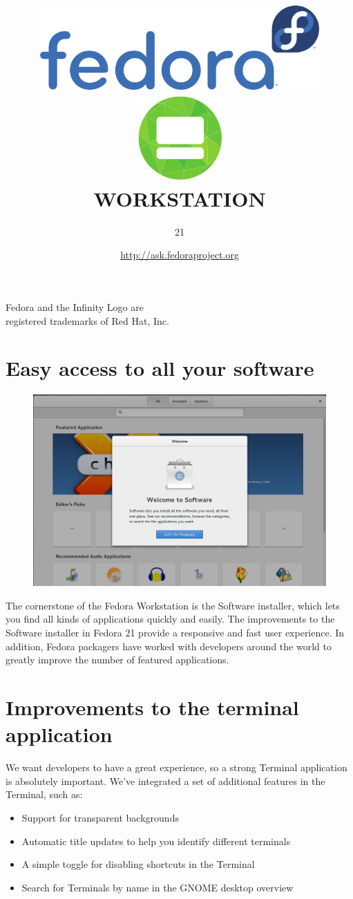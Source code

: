 \documentclass[
10pt
]{leaflet}
\title{\includegraphics[keepaspectratio,width=0.8\textwidth]{Logo_fedoralogo.png}\vspace{1cm}\\\includegraphics[keepaspectratio,scale=0.5]{workstation_logo_only.png}\\\vspace{0.5cm}\LARGE{\textcolor{ResolutionBlue}{WORKSTATION}}}
\author{\LARGE{\textcolor{ResolutionBlue}{21}}}
\date{\href{http://ask.fedoraproject.org}{http://ask.fedoraproject.org}}
\begin{document}
\maketitle
\thispagestyle{empty}
\vspace{5cm}
\begin{center}\small{Fedora and the Infinity Logo are\\registered trademarks of Red Hat, Inc.}\end{center}

\newpage


\section{\textcolor{FedoraBlue}{Easy access to all your software}}
\begin{figure}[h]
  \includegraphics[keepaspectratio,width=\textwidth]{Gnome_software_welcome-cropped.png}
\end{figure}
The cornerstone of the Fedora Workstation is the Software installer, which lets you find all kinds of applications quickly and easily. The improvements to the Software installer in Fedora 21 provide a responsive and fast user experience. In addition, Fedora packagers have worked with developers around the world to greatly improve the number of featured applications.

\section{\textcolor{FedoraBlue}{Improvements to the terminal application}}

We want developers to have a great experience, so a strong Terminal application is absolutely important. We've integrated a set of additional features in the Terminal, such as:
\begin{itemize}
  \item Support for transparent backgrounds
  \item Automatic title updates to help you identify different terminals
  \item A simple toggle for disabling shortcuts in the Terminal
  \item Search for Terminals by name in the GNOME desktop overview
\end{itemize}
\end{document}
